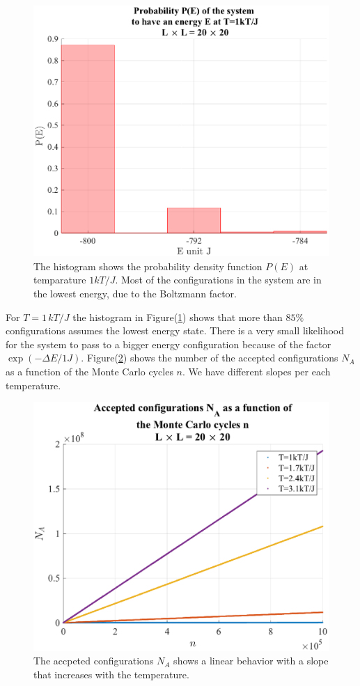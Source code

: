 \documentclass[%
preprint,
 amsmath,amssymb,
 aps,
]{revtex4-1}
\theoremstyle{plain}
\theoremstyle{definition}
\theoremstyle{plain}
\begin{document}
\begin{figure}[h]
\centering
\includegraphics[scale=0.5]{pe20x20.eps}
\caption{The histogram shows the probability density function $P(E)$ at temparature $1 kT/J$. Most of the configurations in the system are in the lowest energy, due to the Boltzmann factor.}
\label{pe20x20}
\end{figure}
For $T=1 \, kT/J$ the histogram in Figure(\ref{pe20x20}) shows that more than $85 \%$ configurations assumes the lowest energy state. There is a very small likelihood for the system to pass to a bigger energy configuration because of the factor $\exp(-\Delta E/1J)$. Figure(\ref{acceptedconf}) shows the number of the accepted configurations $N_A$ as a function of the Monte Carlo cycles $n$. We have different slopes per each temperature.
\begin{figure}[h]
\centering
\includegraphics[scale=0.5]{acceptedconf.eps}
\caption{The accpeted configurations $N_A$ shows a linear behavior with a slope that increases with the temperature.}
\label{acceptedconf}
\end{figure}
\end{document}
